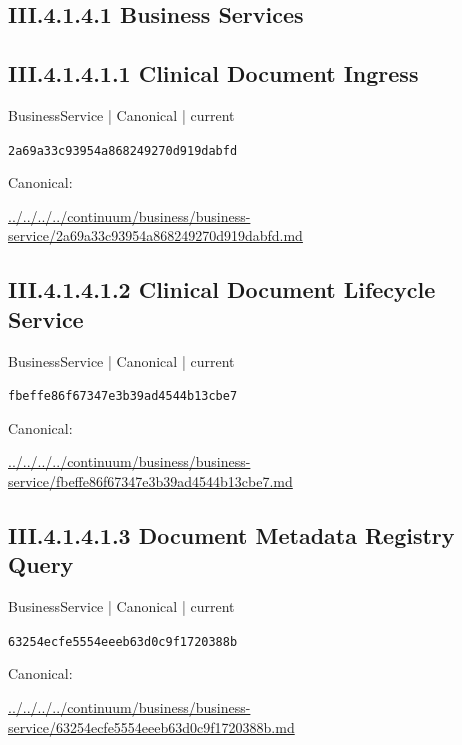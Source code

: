 \documentclass[10pt,a4paper]{article}
\begin{document}
\subsection*{III.4.1.4.1 Business Services}
\subsection*{III.4.1.4.1.1 Clinical Document Ingress}
\label{element-2a69a33c93954a868249270d919dabfd}
{\small BusinessService | Canonical | current}\par
\texttt{2a69a33c93954a868249270d919dabfd}\par
Canonical: \par
{\footnotesize\url{../../../../continuum/business/business-service/2a69a33c93954a868249270d919dabfd.md}}\par
\subsection*{III.4.1.4.1.2 Clinical Document Lifecycle Service}
\label{element-fbeffe86f67347e3b39ad4544b13cbe7}
{\small BusinessService | Canonical | current}\par
\texttt{fbeffe86f67347e3b39ad4544b13cbe7}\par
Canonical: \par
{\footnotesize\url{../../../../continuum/business/business-service/fbeffe86f67347e3b39ad4544b13cbe7.md}}\par
\subsection*{III.4.1.4.1.3 Document Metadata Registry Query}
\label{element-63254ecfe5554eeeb63d0c9f1720388b}
{\small BusinessService | Canonical | current}\par
\texttt{63254ecfe5554eeeb63d0c9f1720388b}\par
Canonical: \par
{\footnotesize\url{../../../../continuum/business/business-service/63254ecfe5554eeeb63d0c9f1720388b.md}}\par
\end{document}
